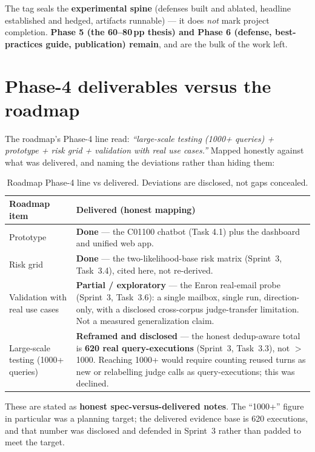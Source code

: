 \documentclass[11pt,a4paper]{article}
\begin{document}
\begin{keyfinding}
The tag seals the \textbf{experimental spine} (defenses built and ablated, headline established and
hedged, artifacts runnable) --- it does \emph{not} mark project completion. \textbf{Phase 5 (the
60--80\,pp thesis) and Phase 6 (defense, best-practices guide, publication) remain}, and are the bulk
of the work left.
\end{keyfinding}

\section{Phase-4 deliverables versus the roadmap}

The roadmap's Phase-4 line read: \emph{``large-scale testing (1000+ queries) + prototype + risk grid
+ validation with real use cases.''} Mapped honestly against what was delivered, and naming the
deviations rather than hiding them:

\begin{table}[h]
\centering
\caption{Roadmap Phase-4 line vs delivered. Deviations are disclosed, not gaps concealed.}
\label{tab:specvsdelivered}
\renewcommand{\arraystretch}{1.2}
\begin{tabularx}{\textwidth}{@{}p{4.2cm}X@{}}
\toprule
\textbf{Roadmap item} & \textbf{Delivered (honest mapping)}\\
\midrule
Prototype & \textbf{Done} --- the C01100 chatbot (Task 4.1) plus the dashboard and unified web app.\\
Risk grid & \textbf{Done} --- the two-likelihood-base risk matrix (Sprint~3, Task~3.4), cited here, not re-derived.\\
Validation with real use cases & \textbf{Partial / exploratory} --- the Enron real-email probe (Sprint~3, Task~3.6): a single mailbox, single run, direction-only, with a disclosed cross-corpus judge-transfer limitation. Not a measured generalization claim.\\
Large-scale testing (1000+ queries) & \textbf{Reframed and disclosed} --- the honest dedup-aware total is \textbf{620 real query-executions} (Sprint~3, Task~3.3), not $>$1000. Reaching 1000+ would require counting reused turns as new or relabelling judge calls as query-executions; this was declined.\\
\bottomrule
\end{tabularx}
\end{table}

\noindent These are stated as \textbf{honest spec-versus-delivered notes}. The ``1000+'' figure in
particular was a planning target; the delivered evidence base is 620 executions, and that number was
disclosed and defended in Sprint~3 rather than padded to meet the target.
\end{document}
